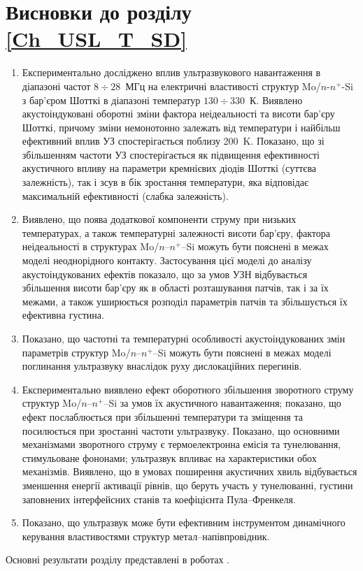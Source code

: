 \section*{Висновки до розділу \ref{Ch_USL_T_SD}}
  \begin{enumerate}[leftmargin=0cm,itemindent=3em]
     \item Експериментально досліджено вплив ультразвукового навантаження в діапазоні частот $8\div28$~МГц на електричні властивості структур Mo/$n$-$n^{+}$-Si з бар'єром Шотткі в діапазоні температур $130\div330$~К.
 Виявлено акустоіндуковані оборотні зміни фактора неідеальності та висоти бар'єру Шотткі, причому зміни немонотонно залежать від температури і найбільш ефективний вплив УЗ спостерігається поблизу 200~K.
  Показано, що зі збільшенням частоти УЗ  спостерігається як підвищення ефективності акустичного впливу на параметри кремнієвих діодів Шотткі (суттєва залежність),
так і зсув в бік зростання температури, яка відповідає максимальній ефективності (слабка залежність).



\item Виявлено, що поява додаткової компоненти струму при низьких температурах, а також температурні залежності висоти бар'єру, фактора неідеальності в структурах Mo/$n$--$n^{+}$--Si можуть бути пояснені в межах моделі неоднорідного контакту.
    Застосування цієї моделі до аналізу акустоіндукованих ефектів показало, що
 за умов УЗН відбувається збільшення висоти бар'єру як в області розташування патчів, так і за їх межами, а також уширюється розподіл параметрів патчів та збільшується їх ефективна густина.


\item Показано, що частотні та температурні особливості акустоіндукованих змін параметрів структур Mo/$n$--$n^{+}$--Si можуть бути пояснені в межах
 моделі поглинання ультразвуку внаслідок руху дислокаційних перегинів.



\item Експериментально виявлено ефект оборотного збільшення зворотного струму структур Mo/$n$--$n^{+}$--Si за умов їх акустичного навантаження;
показано, що ефект послаблюється при збільшенні температури та зміщення та посилюється при зростанні частоти ультразвуку.
Показано, що основними механізмами зворотного струму є термоелектронна емісія та тунелювання, стимульоване фононами;
ультразвук впливає на характеристики обох механізмів.
 Виявлено, що в умовах поширення акустичних хвиль відбувається зменшення енергії активації рівнів, що беруть участь у тунелюванні,
густини заповнених інтерфейсних станів та коефіцієнта Пула--Френкеля.

\item Показано, що ультразвук може бути ефективним інструментом динамічного керування властивостями структур метал--напівпровідник.

  \end{enumerate}	

Основні результати розділу представлені в роботах \cite{Olikh:UPJ2014,OlikhJAP,Olikh:Ultras2016,Olikh2016JSem,
8Drog,2014IUSOl,2015ICU,7UNCPS}.
